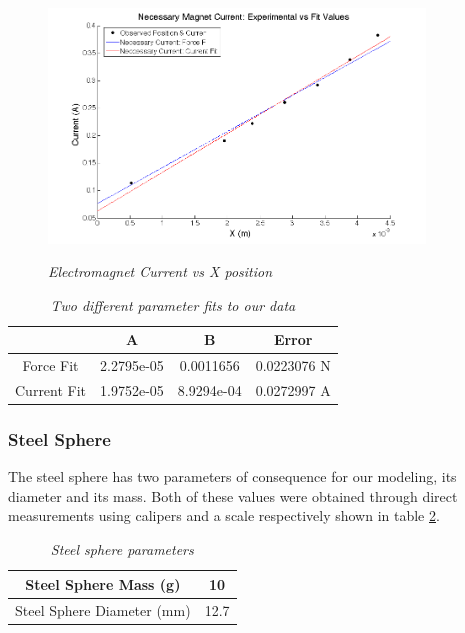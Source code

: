 \documentclass{article}
\theoremstyle{plain}
\theoremstyle{definition}
\theoremstyle{remark}
\begin{document}
\begin{figure}
\begin{center}
\includegraphics[width = 10cm]{magnetDataFits.png}
\label{Q1_d3}
\caption{\emph{Electromagnet Current vs X position}}
\end{center}
\end{figure}

\begin{table}
\begin{center}
    \begin{tabular}{|c|c|c|c|}
        \hline
        ~           & A          & B         &  Error \\ \hline
        Force Fit   & 2.2795e-05 & 0.0011656  & 0.0223076 N \\ 
        Current Fit & 1.9752e-05 & 8.9294e-04 & 0.0272997 A\\
        \hline
    \end{tabular}
\caption{\emph{Two different parameter fits to our data}}
\label{Q1_dt2}
\end{center}
\end{table}

\subsubsection*{Steel Sphere}
The steel sphere has two parameters of consequence for our modeling, its diameter and its mass.  Both of these values were obtained through direct measurements using calipers and a scale respectively shown in table \ref{Q1_dt3}.

\begin{table}[hbt]
\begin{center}
    \begin{tabular}{|c|c|}
        \hline
        Steel Sphere Mass (g)      & 10   \\ \hline
        Steel Sphere Diameter (mm) & 12.7 \\
        \hline
    \end{tabular}
\caption{\emph{Steel sphere parameters}}
\label{Q1_dt3}
\end{center}
\end{table}
\end{document}
